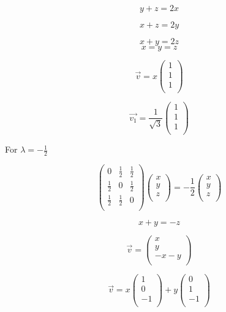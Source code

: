 \documentclass[12pt]{article}
\begin{document}
\[
    y + z = 2x
\]

\[
    x + z = 2y
\]

\[
    x + y = 2z
\]
\[
    x = y = z
\]

\[
    \vec{v} = x \begin{pmatrix}
        1 \\
        1 \\
        1 \\
    \end{pmatrix}
\]

\[
    \vec{v_1} = \frac{1}{\sqrt{3}} \begin{pmatrix}
        1 \\
        1 \\
        1 \\
    \end{pmatrix}
\]

For \(\lambda = -\frac{1}{2}\)

\[
    \begin{pmatrix}
        0           & \frac{1}{2} & \frac{1}{2} \\
        \frac{1}{2} & 0           & \frac{1}{2} \\
        \frac{1}{2} & \frac{1}{2} & 0           \\
    \end{pmatrix} \begin{pmatrix}
        x \\
        y \\
        z \\
    \end{pmatrix} = -\frac{1}{2} \begin{pmatrix}
        x \\
        y \\
        z \\
    \end{pmatrix}
\]

\[
    x + y = - z
\]

\[
    \vec{v} = \begin{pmatrix}
        x      \\
        y      \\
        -x - y \\
    \end{pmatrix}
\]

\[
    \vec{v} = x \begin{pmatrix}
        1  \\
        0  \\
        -1 \\
    \end{pmatrix} +
    y \begin{pmatrix}
        0  \\
        1  \\
        -1 \\
    \end{pmatrix}
\]
\end{document}
